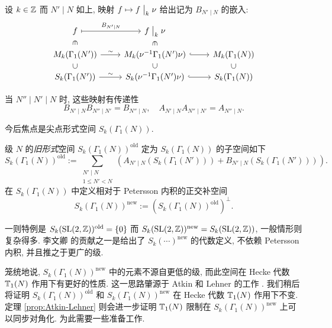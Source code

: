 \begin{proposition}\label{prop:oldform}
	设 $k \in \mathbb{Z}$ 而 $N' \mid N$ 如上, 映射 $f \mapsto f \;\big|_{k} \; \nu$ 给出记为 $B_{N' \mid N}$ 的嵌入:
	\[\begin{tikzcd}[row sep=small]
		f \arrow[r, mapsto, "B_{N' \mid N}"] \arrow[phantom, d, "\in" sloped] & f \modact{k} \nu \arrow[phantom, d, "\in" sloped] & \\
		M_k(\Gamma_1(N')) \arrow[r, "\sim"] & M_k(\nu^{-1} \Gamma_1(N') \nu ) \arrow[hookrightarrow, r] & M_k(\Gamma_1(N)) \\
		S_k(\Gamma_1(N')) \arrow[r, "\sim"] \arrow[phantom, u, "\subset" sloped] & S_k(\nu^{-1} \Gamma_1(N') \nu ) \arrow[hookrightarrow, r] \arrow[phantom, u, "\subset" sloped] & S_k(\Gamma_1(N)) \arrow[phantom, u, "\subset" sloped]
	\end{tikzcd}\]
\end{proposition}
当 $N'' \mid N' \mid N$ 时, 这些映射有传递性
\[ B_{N' \mid N} B_{N'' \mid N'} = B_{N'' \mid N}, \quad A_{N' \mid N} A_{N'' \mid N'} = A_{N'' \mid N}. \]

今后焦点是尖点形式空间 $S_k(\Gamma_1(N))$.

\begin{definition}\label{def:oldform}
	 
	级 $N$ 的\emph{旧形式}空间 $S_k(\Gamma_1(N))^{\mathrm{old}}$ 定为 $S_k(\Gamma_1(N))$ 的子空间如下
	\[ S_k(\Gamma_1(N))^{\mathrm{old}} := \sum_{\substack{N' \mid N \\ 1 \leq N' < N}} \left( A_{N' \mid N} \left( S_k(\Gamma_1(N')) \right) + B_{N' \mid N} \left( S_k(\Gamma_1(N')) \right) \right). \]
	在 $S_k(\Gamma_1(N))$ 中定义相对于 Petersson 内积的正交补空间
	\[ S_k(\Gamma_1(N))^{\mathrm{new}} := \left( S_k(\Gamma_1(N))^{\mathrm{old}} \right)^\perp. \]
\end{definition}

一则特例是 $S_k(\operatorname{SL}(2,\mathbb{Z}))^{\mathrm{old}} = \{0\}$ 而 $S_k(\operatorname{SL}(2,\mathbb{Z}))^{\mathrm{new}} = S_k(\operatorname{SL}(2,\mathbb{Z}))$, 一般情形则复杂得多. 李文卿 \cite{Li75} 的贡献之一是给出了 $S_k(\cdots)^{\mathrm{new}}$ 的代数定义, 不依赖 Petersson 内积, 并且推之于更广的级.

笼统地说, $S_k(\Gamma_1(N))^{\mathrm{new}}$ 中的元素不源自更低的级, 而此空间在 Hecke 代数 $\mathbb{T}_1(N)$ 作用下有更好的性质. 这一思路肇源于 Atkin 和 Lehner 的工作 \cite{AL70}. 我们稍后将证明 $S_k(\Gamma_1(N))^\text{old}$ 和 $S_k(\Gamma_1(N))^\text{new}$ 在 Hecke 代数 $\mathbb{T}_1(N)$ 作用下不变. 定理 \ref{prop:Atkin-Lehner} 则会进一步证明 $\mathbb{T}_1(N)$ 限制在 $S_k(\Gamma_1(N))^{\mathrm{new}}$ 上可以同步对角化. 为此需要一些准备工作.


